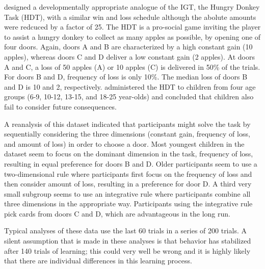 \documentclass[a4paper,12pt,man,english]{apa} %
\begin{document}
\cite{Crone2004} designed a developmentally appropriate analogue of
the IGT, the Hungry Donkey Task (HDT), with a similar win and loss
schedule although the abolute amounts were redcuced by a factor of 25.
The HDT is a pro-social game inviting the player to assist a hungry
donkey to collect as many apples as possible, by opening one of four
doors.  Again, doors A and B are characterized by a high constant gain
(10 apples), whereas doors C and D deliver a low constant gain (2
apples).  At doors A and C, a loss of 50 apples (A) or 10 apples (C)
is delivered in 50\% of the trials.  For doors B and D, frequency of
loss is only 10\%.  The median loss of doors B and D is 10 and 2,
respectively.  \cite{Crone2004} administered the HDT to children from
four age groups (6-9, 10-12, 13-15, and 18-25 year-olds) and concluded
that children also fail to consider future consequences.

A reanalysis of this dataset \cite{Huizenga2007} indicated that
participants might solve the task by sequentially considering the
three dimensions (constant gain, frequency of loss, and amount of
loss) in order to choose a door.  Most youngest children in the
dataset seem to focus on the dominant dimension in the task, frequency
of loss, resulting in equal preference for doors B and D. Older
participants seem to use a two-dimensional rule where participants
first focus on the frequency of loss and then consider amount of loss,
resulting in a preference for door D. A third very small subgroup
seems to use an integrative rule where participants combine all three
dimensions in the appropriate way.  Participants using the integrative
rule pick cards from doors C and D, which are advantageous in the long
run.

Typical analyses of these data use the last 60 trials in a series of
200 trials.  A silent assumption that is made in these analyses is
that behavior has stabilized after 140 trials of learning; this could
very well be wrong and it is highly likely that there are individual
differences in this learning process.
\end{document}
